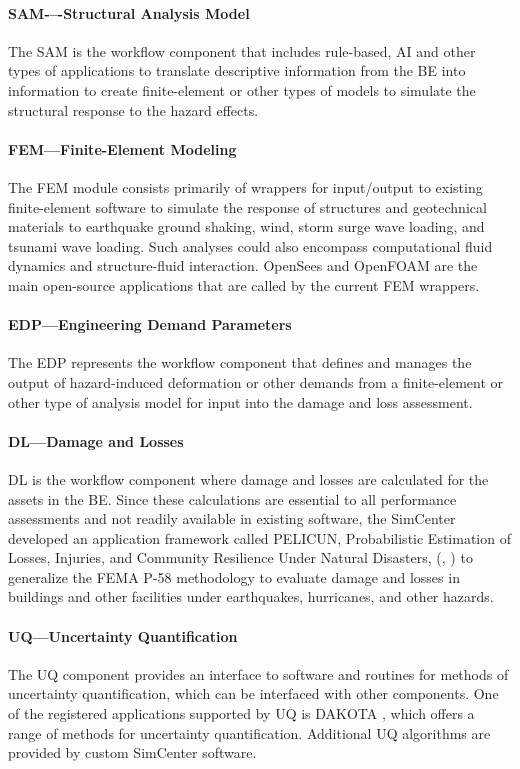 \paragraph{SAM-–-Structural Analysis Model} The SAM is the workflow component that includes rule-based, AI and other types of applications to translate descriptive information from the BE into information to create finite-element or other types of models to simulate the structural response to the hazard effects. 

\paragraph{FEM---Finite-Element Modeling} The FEM module consists primarily of wrappers for input/output to  existing finite-element software to simulate the response of structures and geotechnical materials to earthquake ground shaking, wind, storm surge wave loading, and tsunami wave loading.  Such analyses could also encompass computational fluid dynamics and structure-fluid interaction.  OpenSees  and OpenFOAM  are the main open-source applications that are called by the current FEM wrappers.

\paragraph{EDP---Engineering Demand Parameters} The EDP represents the workflow component that defines and manages the output of hazard-induced deformation or other demands from a finite-element or other type of analysis model for input into the damage and loss assessment.

\paragraph{DL---Damage and Losses}  DL is the workflow component where damage and losses are calculated for the assets in the BE. Since these calculations are essential to all performance assessments and not readily available in existing software, the SimCenter developed an application framework called PELICUN, Probabilistic Estimation of Losses, Injuries, and Community Resilience Under Natural Disasters, (\cite{zsarnoczay2020pelicun}, ) to generalize the FEMA P-58 methodology to evaluate damage and losses in buildings and other facilities under earthquakes, hurricanes, and other hazards. 

\paragraph{UQ---Uncertainty Quantification} The UQ component provides an interface to software and routines for methods of uncertainty quantification, which can be interfaced with other components.  One of the registered applications supported by UQ is DAKOTA \citep{adams2009dakota}, which offers a range of methods for uncertainty quantification. Additional UQ algorithms are provided by custom SimCenter software.

